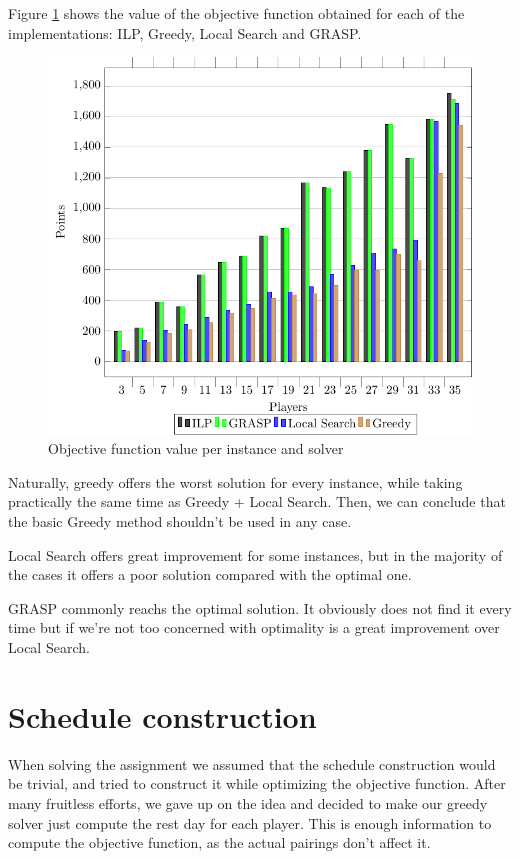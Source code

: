 \documentclass[a4paper, 10pt]{article}
\begin{document}
Figure \ref{fig:objfunc} shows the value of the objective function obtained for each of the implementations: ILP, Greedy, Local Search and GRASP. 


\begin{figure}[H]
    \centering
    \includegraphics[width=\linewidth]{plots/solutions.pdf}
    \caption{Objective function value per instance and solver}
    \label{fig:objfunc}
\end{figure}

Naturally, greedy offers the worst solution for every instance, while taking practically the same time as Greedy + Local Search. Then, we can conclude that the basic Greedy method shouldn't be used in any case.

Local Search offers great improvement for some instances, but in the majority of the cases it offers a poor solution compared with the optimal one.

GRASP commonly reachs the optimal solution. It obviously does not find it every time but if we're not too concerned with optimality is a great improvement over Local Search.


\clearpage
\section{Schedule construction}
\label{sec:schedule}

When solving the assignment we assumed that the schedule construction would be trivial, and tried to construct it while optimizing the objective function. After many fruitless efforts, we gave up on the idea and decided to make our greedy solver just compute the rest day for each player. This is enough information to compute the objective function, as the actual pairings don't affect it.
\end{document}
